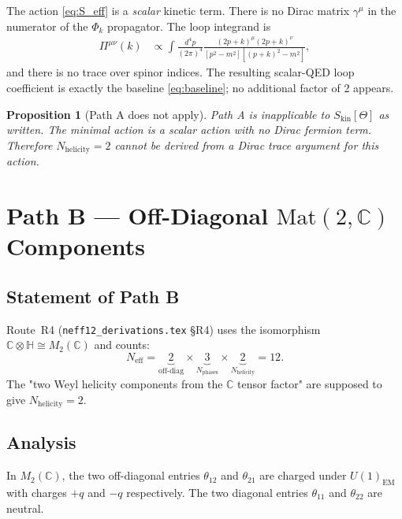 \documentclass[12pt,a4paper]{article}
\newtheorem{proposition}[theorem]{Proposition}
\theoremstyle{remark}
\newcommand{\Neff}{N_{\mathrm{eff}}}
\newcommand{\Nhelicity}{N_{\mathrm{helicity}}}
\begin{document}
The action \eqref{eq:S_eff} is a \emph{scalar} kinetic term.  There is no
Dirac matrix $\gamma^\mu$ in the numerator of the $\Phi_k$ propagator.
The loop integrand is
\begin{align}
  \Pi^{\mu\nu}(k) &\propto \int \frac{d^4p}{(2\pi)^4}
  \frac{(2p+k)^\mu(2p+k)^\nu}{[p^2-m^2][(p+k)^2-m^2]},
  \label{eq:scalar_loop}
\end{align}
and there is no trace over spinor indices.  The resulting scalar-QED loop
coefficient is exactly the baseline \eqref{eq:baseline}; no additional
factor of 2 appears.

\begin{proposition}[Path A does not apply]
\label{prop:pathA}
Path A is inapplicable to $S_{\mathrm{kin}}[\Theta]$ as written.  The
minimal action is a scalar action with no Dirac fermion term.  Therefore
$\Nhelicity = 2$ cannot be derived from a Dirac trace argument for this action.
\end{proposition}

\section{Path B — Off-Diagonal $\mathrm{Mat}(2,\mathbb{C})$ Components}
\label{sec:pathB}

\subsection{Statement of Path B}

Route~R4 (\texttt{neff12\_derivations.tex} §R4) uses the isomorphism
$\mathbb{C}\otimes\mathbb{H} \cong M_2(\mathbb{C})$ and counts:
\begin{equation}
  \Neff = \underbrace{2}_{\text{off-diag}}
         \times
         \underbrace{3}_{N_{\mathrm{phases}}}
         \times
         \underbrace{2}_{\Nhelicity}
  = 12.
  \label{eq:R4}
\end{equation}
The "two Weyl helicity components from the $\mathbb{C}$ tensor factor"
are supposed to give $\Nhelicity = 2$.

\subsection{Analysis}

In $M_2(\mathbb{C})$, the two off-diagonal entries $\theta_{12}$ and
$\theta_{21}$ are charged under $U(1)_{\mathrm{EM}}$ with charges $+q$
and $-q$ respectively.  The two diagonal entries $\theta_{11}$ and
$\theta_{22}$ are neutral.
\end{document}
